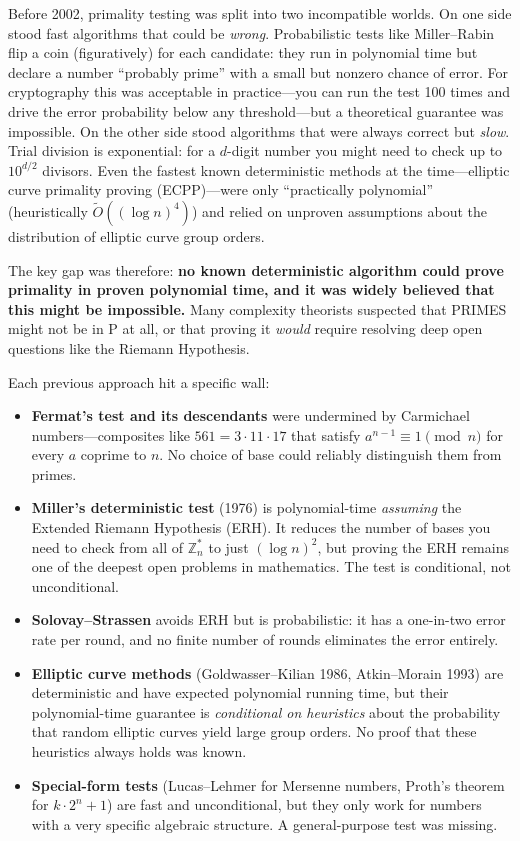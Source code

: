 Before 2002, primality testing was split into two incompatible worlds. On one side stood fast algorithms that could be \emph{wrong}. Probabilistic tests like Miller--Rabin flip a coin (figuratively) for each candidate: they run in polynomial time but declare a number ``probably prime'' with a small but nonzero chance of error. For cryptography this was acceptable in practice---you can run the test 100 times and drive the error probability below any threshold---but a theoretical guarantee was impossible. On the other side stood algorithms that were always correct but \emph{slow}. Trial division is exponential: for a $d$-digit number you might need to check up to $10^{d/2}$ divisors. Even the fastest known deterministic methods at the time---elliptic curve primality proving (ECPP)---were only ``practically polynomial'' (heuristically $\tilde{O}((\log n)^4)$) and relied on unproven assumptions about the distribution of elliptic curve group orders.

The key gap was therefore: \textbf{no known deterministic algorithm could prove primality in proven polynomial time, and it was widely believed that this might be impossible.} Many complexity theorists suspected that PRIMES might not be in P at all, or that proving it \emph{would} require resolving deep open questions like the Riemann Hypothesis.

Each previous approach hit a specific wall:

\begin{itemize}
\item \textbf{Fermat's test and its descendants} were undermined by Carmichael numbers---composites like $561 = 3 \cdot 11 \cdot 17$ that satisfy $a^{n-1} \equiv 1 \pmod{n}$ for every $a$ coprime to $n$. No choice of base could reliably distinguish them from primes.
\item \textbf{Miller's deterministic test} (1976) is polynomial-time \emph{assuming} the Extended Riemann Hypothesis (ERH). It reduces the number of bases you need to check from all of $\mathbb{Z}_n^*$ to just $(\log n)^2$, but proving the ERH remains one of the deepest open problems in mathematics. The test is conditional, not unconditional.
\item \textbf{Solovay--Strassen} avoids ERH but is probabilistic: it has a one-in-two error rate per round, and no finite number of rounds eliminates the error entirely.
\item \textbf{Elliptic curve methods} (Goldwasser--Kilian 1986, Atkin--Morain 1993) are deterministic and have expected polynomial running time, but their polynomial-time guarantee is \emph{conditional on heuristics} about the probability that random elliptic curves yield large group orders. No proof that these heuristics always holds was known.
\item \textbf{Special-form tests} (Lucas--Lehmer for Mersenne numbers, Proth's theorem for $k \cdot 2^n + 1$) are fast and unconditional, but they only work for numbers with a very specific algebraic structure. A general-purpose test was missing.
\end{itemize}

